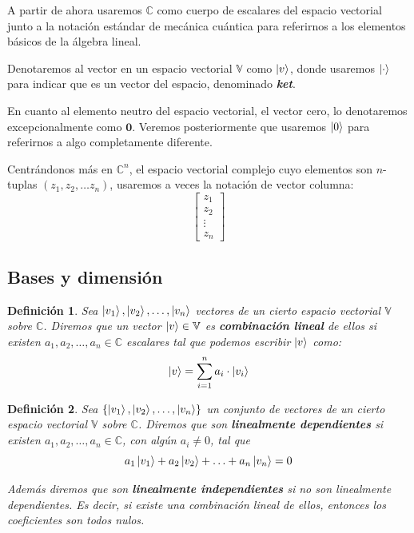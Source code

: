 \documentclass[a4paper]{article}
\newtheorem{deff}{Definición}[section]
\numberwithin{equation}{section}
\begin{document}
A partir de ahora usaremos $\mathbb{C}$ como cuerpo de escalares del espacio vectorial junto a la notación estándar de mecánica cuántica para referirnos a los elementos básicos de la álgebra lineal.

Denotaremos al vector en un espacio vectorial $\mathbb{V}$ como $\ket{v}$, donde usaremos $\ket{\cdot}$ para indicar que es un vector del espacio, denominado \textbf{\textit{ket}}.

En cuanto al elemento neutro del espacio vectorial, el vector cero, lo denotaremos excepcionalmente como $\mathbf{0}$. Veremos posteriormente que usaremos $\ket{0}$ para referirnos a algo completamente diferente.

Centrándonos más en $\mathbb{C}^n$, el espacio vectorial complejo cuyo elementos son $n$-tuplas $(z_1, z_2, \ldots z_n)$, usaremos a veces la notación de vector columna:
$$\begin{bmatrix}
z_1 \\ z_2 \\ \vdots \\ z_n
\end{bmatrix}$$

\subsection{Bases y dimensión}

\begin{deff} Sea $\ket{v_1},\ket{v_2}, \ldots, \ket{v_n}$ vectores de un cierto espacio vectorial $\mathbb{V}$ sobre $\mathbb{C}$. Diremos que un vector $\ket{v}\in\mathbb{V}$ es \textbf{combinación lineal} de ellos si existen $a_1, a_2, \ldots, a_n \in \mathbb{C}$ escalares tal que podemos escribir $\ket{v}$ como:
\begin{equation}
\ket{v} = \sum_{i=1}^n a_i \cdot \ket{v_i}
\end{equation}
\end{deff}

\begin{deff} Sea $\{ \ket{v_1},\ket{v_2}, \ldots, \ket{v_n} \}$ un conjunto de vectores de un cierto espacio vectorial $\mathbb{V}$ sobre $\mathbb{C}$. Diremos que son \textbf{linealmente dependientes} si existen $a_1, a_2, \ldots, a_n \in \mathbb{C}$, con algún $a_i \neq 0$, tal que
\begin{equation}
a_1\ket{v_1} + a_2\ket{v_2} + \ldots + a_n\ket{v_n} = 0
\end{equation}

Además diremos que son \textbf{linealmente independientes} si no son linealmente dependientes. Es decir, si existe una combinación lineal de ellos, entonces los coeficientes son todos nulos.
\end{deff}
\end{document}
